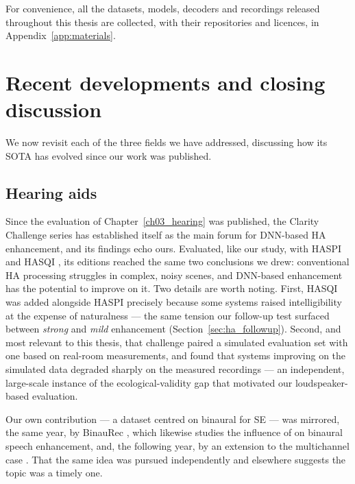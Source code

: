 For convenience, all the datasets, models, decoders and recordings released
throughout this thesis are collected, with their repositories and licences, in
Appendix~\ref{app:materials}.

\section{Recent developments and closing discussion}
\label{sec:conc_recent}
We now revisit each of the three fields we have addressed, discussing how its \acrshort{SOTA} has evolved since our work was published.

\subsection{Hearing aids}
\label{ssec:conc_ha}

Since the evaluation of Chapter~\ref{ch03_hearing} was published, the Clarity
Challenge series has established itself as the main forum for
\acrshort{DNN}-based \acrshort{HA} enhancement, and its findings echo ours.
Evaluated, like our study, with \acrshort{HASPI} and \acrshort{HASQI}
\citep{cox2023clarity}, its editions reached the same two conclusions we drew:
conventional \acrshort{HA} processing struggles in complex, noisy scenes, and
\acrshort{DNN}-based enhancement has the potential to improve on it. Two details
are worth noting. First, \acrshort{HASQI} was added alongside \acrshort{HASPI}
precisely because some systems raised intelligibility at the expense of
naturalness \citep{cox2023clarity} --- the same tension our follow-up test
surfaced between \emph{strong} and \emph{mild} enhancement
(Section~\ref{sec:ha_followup}). Second, and most relevant to this thesis, that
challenge paired a simulated evaluation set with one based on real-room
measurements, and found that systems improving on the simulated data degraded
sharply on the measured recordings \citep{cox2023clarity} --- an independent,
large-scale instance of the ecological-validity gap that motivated our
loudspeaker-based evaluation.

Our own contribution --- a dataset centred on binaural  for
 \acrshort{SE} --- was mirrored, the same year, by BinauRec
\citep{delebecque2023binaurec}, which likewise studies the influence of
 on binaural speech enhancement, and, the following year, by an
extension to the multichannel case \citep{westhausen2024binaural}. That the same
idea was pursued independently and elsewhere suggests the topic was a timely one.

